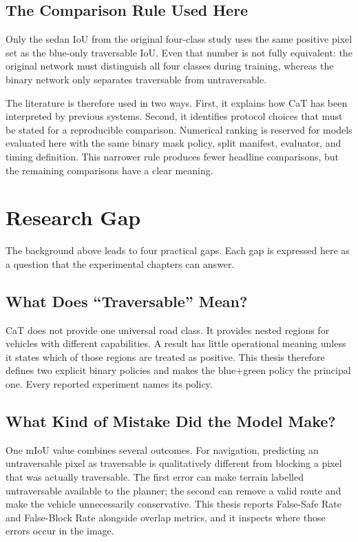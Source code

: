 \subsection{The Comparison Rule Used Here}

Only the sedan IoU from the original four-class study uses the same positive
pixel set as the blue-only traversable IoU. Even that number is not fully
equivalent: the original network must distinguish all four classes during
training, whereas the binary network only separates traversable from
untraversable.

The literature is therefore used in two ways. First, it explains how CaT has
been interpreted by previous systems. Second, it identifies protocol choices
that must be stated for a reproducible comparison. Numerical ranking is
reserved for models evaluated here with the same binary mask policy, split
manifest, evaluator, and timing definition. This narrower rule produces fewer
headline comparisons, but the remaining comparisons have a clear meaning.

\section{Research Gap}

The background above leads to four practical gaps. Each gap is expressed here
as a question that the experimental chapters can answer.

\subsection{What Does ``Traversable'' Mean?}

CaT does not provide one universal road class. It provides nested regions for
vehicles with different capabilities. A result has little operational meaning
unless it states which of those regions are treated as positive. This thesis
therefore defines two explicit binary policies and makes the blue+green policy
the principal one. Every reported experiment names its policy.

\subsection{What Kind of Mistake Did the Model Make?}

One mIoU value combines several outcomes. For navigation, predicting an
untraversable pixel as traversable is qualitatively different from blocking a
pixel that was actually traversable. The first error can make terrain labelled
untraversable available to the planner;
the second can remove a valid route and make the vehicle unnecessarily
conservative. This thesis reports False-Safe Rate and False-Block Rate
alongside overlap metrics, and it inspects where those errors occur in the
image.

